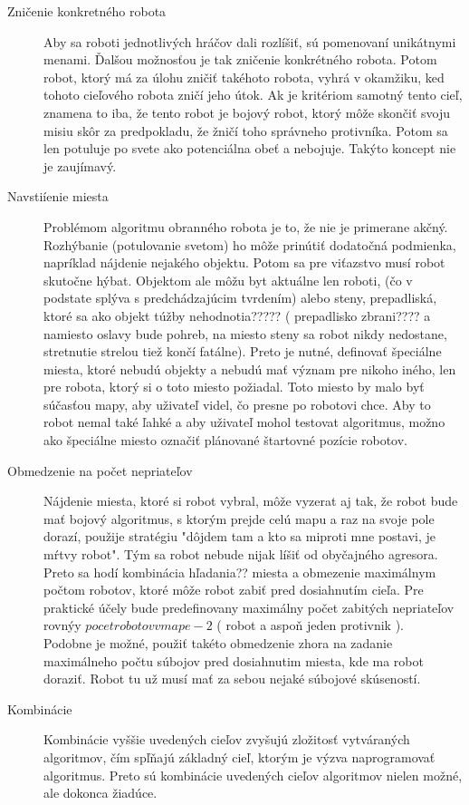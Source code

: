 \begin{description}
\item [Zničenie konkretného robota] \hfill \newline
Aby sa roboti jednotlivých hráčov dali rozlíšiť, sú pomenovaní unikátnymi menami. Ďalšou možnosťou je tak zničenie konkrétného robota. Potom robot, ktorý má za úlohu zničiť takéhoto robota, vyhrá v okamžiku, ked tohoto cieľového robota zničí jeho útok. Ak je kritériom samotný tento cieľ, znamena to iba, že tento robot je bojový robot, ktorý môže skončiť svoju misiu skôr za predpokladu, že žničí toho správneho protivníka. Potom sa len potuluje po svete ako potenciálna obeť a nebojuje. Takýto koncept nie je zaujímavý.
\item [Navstiíenie miesta]
Problémom algoritmu obranného robota je to, že nie je primerane akčný. Rozhýbanie (potulovanie svetom) ho môže prinútiť dodatočná podmienka, napríklad nájdenie nejakého objektu. Potom sa pre viťazstvo musí robot skutočne hýbat. Objektom ale môžu byt aktuálne len roboti,  (čo v podstate splýva s predchádzajúcim tvrdením) alebo steny, prepadliská, ktoré sa ako objekt túžby nehodnotia????? ( prepadlisko zbrani???? a namiesto oslavy bude pohreb, na miesto steny sa robot nikdy nedostane, stretnutie strelou tiež končí fatálne). Preto je nutné, definovať špeciálne miesta, ktoré nebudú objekty a nebudú mať význam pre nikoho iného, len pre robota, ktorý si o toto miesto požiadal. Toto miesto by malo byť súčasťou mapy, aby uživateľ videl, čo presne po robotovi chce. Aby to robot nemal také ľahké a aby uživateľ mohol testovat algoritmus, možno ako špeciálne miesto označiť  plánované štartovné pozície robotov. \\
\item [Obmedzenie na počet nepriateľov]
Nájdenie miesta, ktoré si robot vybral, môže vyzerat aj tak, že robot bude mať bojový algoritmus, s ktorým prejde celú mapu a raz na svoje pole dorazí, použije stratégiu  "dôjdem tam a kto sa miproti mne  postavi, je mŕtvy robot". Tým sa robot nebude nijak líšiť od obyčajného agresora. Preto sa hodí kombinácia hľadania?? miesta a obmezenie  maximálnym počtom robotov, ktoré môže robot zabiť pred dosiahnutím cieľa. Pre praktické účely bude predefinovany maximálny počet zabitých nepriateľov rovnýy $pocet robotov v mape - 2$ ( robot a aspoň jeden protivnik ).\\
Podobne je možné,  použiť takéto obmedzenie zhora na zadanie maximálneho počtu súbojov pred dosiahnutim miesta, kde ma robot doraziť. Robot tu už musí mať za sebou nejaké súbojové skúseností.
\item [Kombinácie]
Kombinácie vyššie uvedených cieľov zvyšujú zložitosť vytváraných algoritmov, čím spľňajú základný cieľ, ktorým je výzva naprogramovať algoritmus. Preto sú kombinácie uvedených cieľov algoritmov nielen možné, ale dokonca žiadúce.
\end{description}
